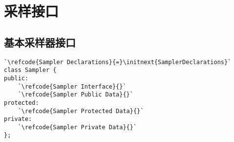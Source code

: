 \section{采样接口}\label{sec:采样接口}

\subsection{基本采样器接口}\label{sub:基本采样器接口}
\label{code:overview_Sampler}
\begin{lstlisting}
`\refcode{Sampler Declarations}{=}\initnext{SamplerDeclarations}`
class Sampler {
public:
    `\refcode{Sampler Interface}{}`
    `\refcode{Sampler Public Data}{}`
protected:
    `\refcode{Sampler Protected Data}{}`
private:
    `\refcode{Sampler Private Data}{}`
};
\end{lstlisting}